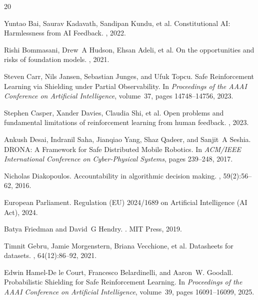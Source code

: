 \documentclass[sigconf,nonacm]{acmart}
\begin{document}

\begin{thebibliography}{20}

Yuntao Bai, Saurav Kadavath, Sandipan Kundu, et al.
\newblock Constitutional AI: Harmlessness from AI Feedback.
, 2022.

Rishi Bommasani, Drew~A Hudson, Ehsan Adeli, et al.
\newblock On the opportunities and risks of foundation models.
, 2021.

Steven Carr, Nils Jansen, Sebastian Junges, and Ufuk Topcu.
\newblock Safe Reinforcement Learning via Shielding under Partial Observability.
\newblock In {\em Proceedings of the AAAI Conference on Artificial Intelligence}, volume~37, pages 14748--14756, 2023.

Stephen Casper, Xander Davies, Claudia Shi, et al.
\newblock Open problems and fundamental limitations of reinforcement learning from human feedback.
, 2023.

Ankush Desai, Indranil Saha, Jianqiao Yang, Shaz Qadeer, and Sanjit~A Seshia.
\newblock DRONA: A Framework for Safe Distributed Mobile Robotics.
\newblock In {\em ACM/IEEE International Conference on Cyber-Physical Systems}, pages 239--248, 2017.

Nicholas Diakopoulos.
\newblock Accountability in algorithmic decision making.
, 59(2):56--62, 2016.

European Parliament.
\newblock Regulation (EU) 2024/1689 on Artificial Intelligence (AI Act), 2024.

Batya Friedman and David~G Hendry.
.
\newblock MIT Press, 2019.

Timnit Gebru, Jamie Morgenstern, Briana Vecchione, et al.
\newblock Datasheets for datasets.
, 64(12):86--92, 2021.

Edwin Hamel-De le Court, Francesco Belardinelli, and Aaron~W. Goodall.
\newblock Probabilistic Shielding for Safe Reinforcement Learning.
\newblock In {\em Proceedings of the AAAI Conference on Artificial Intelligence}, volume~39, pages 16091--16099, 2025.


\end{thebibliography}
\end{document}
